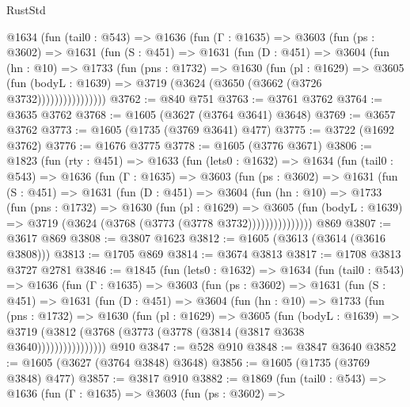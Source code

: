 \begin{lexlean}{RustStd}
\begin{coremodule}
{\begin{coremodule}
{{{{{{{{{{{{{{        @1634
          (fun (tail0 : @543) =>
          @1636
            (fun (Γ : @1635) =>
            @3603
              (fun (ps : @3602) =>
              @1631
                (fun (S : @451) =>
                @1631
                  (fun (D : @451) =>
                  @3604
                    (fun (hn : @10) =>
                    @1733
                      (fun (pns : @1732) =>
                      @1630
                        (fun (pl : @1629) =>
                        @3605
                          (fun (bodyL : @1639) =>
                          @3719 (@3624 (@3650 (@3662 (@3726 @3732))))))))))))))))
@3762 := @840 @751
@3763 := @3761 @3762
@3764 := @3635 @3762
@3768 := @1605 (@3627 (@3764 @3641) @3648)
@3769 := @3657 @3762
@3773 := @1605 (@1735 (@3769 @3641) @477)
@3775 := @3722 (@1692 @3762)
@3776 := @1676 @3775
@3778 := @1605 (@3776 @3671)
@3806 := @1823
    (fun (rty : @451) =>
    @1633
      (fun (lets0 : @1632) =>
      @1634
        (fun (tail0 : @543) =>
        @1636
          (fun (Γ : @1635) =>
          @3603
            (fun (ps : @3602) =>
            @1631
              (fun (S : @451) =>
              @1631
                (fun (D : @451) =>
                @3604
                  (fun (hn : @10) =>
                  @1733
                    (fun (pns : @1732) =>
                    @1630
                      (fun (pl : @1629) =>
                      @3605
                        (fun (bodyL : @1639) =>
                        @3719 (@3624 (@3768 (@3773 (@3778 @3732)))))))))))))))
    @869
@3807 := @3617 @869
@3808 := @3807 @1623
@3812 := @1605 (@3613 (@3614 (@3616 @3808)))
@3813 := @1705 @869
@3814 := @3674 @3813
@3817 := @1708 @3813 @3727 @2781
@3846 := @1845
    (fun (lets0 : @1632) =>
    @1634
      (fun (tail0 : @543) =>
      @1636
        (fun (Γ : @1635) =>
        @3603
          (fun (ps : @3602) =>
          @1631
            (fun (S : @451) =>
            @1631
              (fun (D : @451) =>
              @3604
                (fun (hn : @10) =>
                @1733
                  (fun (pns : @1732) =>
                  @1630
                    (fun (pl : @1629) =>
                    @3605
                      (fun (bodyL : @1639) =>
                      @3719 (@3812 (@3768 (@3773 (@3778 (@3814 (@3817 @3638 @3640))))))))))))))))
    @910
@3847 := @528 @910
@3848 := @3847 @3640
@3852 := @1605 (@3627 (@3764 @3848) @3648)
@3856 := @1605 (@1735 (@3769 @3848) @477)
@3857 := @3817 @910
@3882 := @1869
    (fun (tail0 : @543) =>
    @1636
      (fun (Γ : @1635) =>
      @3603
        (fun (ps : @3602) =>
}}}}}}}}}}}}}}
\end{coremodule}}
\end{coremodule}
\end{lexlean}
